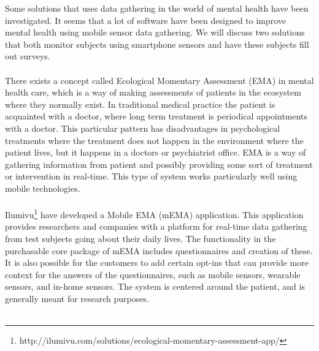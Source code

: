 Some solutions that uses data gathering in the world of mental health have been investigated. It seems that a lot of software have been designed to improve mental health using mobile sensor data gathering. We will discuss two solutions that both monitor subjects using smartphone sensors and have these subjects fill out surveys. 
\\\\
There exists a concept called Ecological Momentary Assessment (EMA) \parencite{shiffman2008ecological} in mental health care, which is a way of making assessments of patients in the ecosystem where they normally exist. In traditional medical practice the patient is acquainted with a doctor, where long term treatment is periodical appointments with a doctor. This particular pattern has disadvantages in psychological treatments where the treatment does not happen in the environment where the patient lives, but it happens in a doctors or psychiatrist office. EMA is a way of gathering information from patient and possibly providing some sort of treatment or intervention in real-time. This type of system works particularly well using mobile technologies.
\\\\
Ilumivu\footnote{http://ilumivu.com/solutions/ecological-momentary-assessment-app/} have developed a Mobile EMA (mEMA) application. This application provides researchers and companies with a platform for real-time data gathering from test subjects going about their daily lives. The functionality in the purchasable core package of mEMA includes questionnaires and creation of these. It is also possible for the customers to add certain opt-ins that can provide more context for the answers of the questionnaires, such as mobile sensors, wearable sensors, and in-home sensors. The system is centered around the patient, and is generally meant for research purposes.
\\\\
